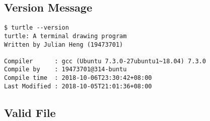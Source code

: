 \documentclass[a4paper, 12pt, titlepage]{article}
\begin{document}
\subsection{Version Message}

\begin{lstlisting}
$ turtle --version
turtle: A terminal drawing program
Written by Julian Heng (19473701)

Compiler      : gcc (Ubuntu 7.3.0-27ubuntu1~18.04) 7.3.0
Compile by    : 19473701@314-buntu
Compile time  : 2018-10-06T23:30:42+08:00
Last Modified : 2018-10-05T21:01:36+08:00
\end{lstlisting}

\subsection{Valid File}
\end{document}
